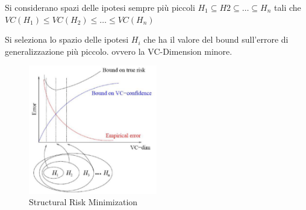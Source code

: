 Si considerano spazi delle ipotesi sempre più piccoli $H_1 \subseteq H2 \subseteq \ldots \subseteq H_n$ tali che $ VC(H_1) \leq VC(H_2) \leq \ldots \leq VC(H_n)$

Si seleziona lo spazio delle ipotesi $H_i$ che ha il valore del bound
sull'errore di generalizzazione più piccolo. ovvero la VC-Dimension minore.

\begin{figure}[htbp]
\centering
\includegraphics[width=0.5\textwidth]{./notes/immagini/l5-srm.png}
\caption{Structural Risk Minimization}
\end{figure}
